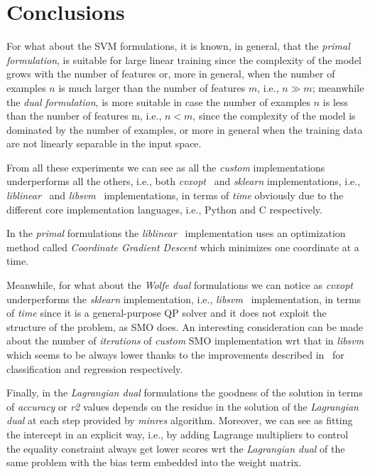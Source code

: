 \section{Conclusions}

For what about the SVM formulations, it is known, in general, that the \emph{primal formulation}, is suitable for large linear training since the complexity of the model grows with the number of features or, more in general, when the number of examples $n$ is much larger than the number of features $m$, i.e., $n \gg m$; meanwhile the \emph{dual formulation}, is more suitable in case the number of examples $n$ is less than the number of features m, i.e., $n < m$, since the complexity of the model is dominated by the number of examples, or more in general when the training data are not linearly separable in the input space.

\bigskip

From all these experiments we can see as all the \emph{custom} implementations underperforms all the others, i.e., both \emph{cvxopt}~\cite{vandenberghe2010cvxopt} and \emph{sklearn} implementations, i.e., \emph{liblinear}~\cite{fan2008liblinear} and \emph{libsvm}~\cite{chang2011libsvm} implementations, in terms of \emph{time} obviously due to the different core implementation languages, i.e., Python and C respectively.

In the \emph{primal} formulations the \emph{liblinear}~\cite{fan2008liblinear} implementation uses an optimization method called \emph{Coordinate Gradient Descent} which minimizes one coordinate at a time.

Meanwhile, for what about the \emph{Wolfe dual} formulations we can notice as \emph{cvxopt}~\cite{vandenberghe2010cvxopt} underperforms the \emph{sklearn} implementation, i.e., \emph{libsvm}~\cite{chang2011libsvm} implementation, in terms of \emph{time} since it is a general-purpose QP solver and it does not exploit the structure of the problem, as SMO does. An interesting consideration can be made about the number of \emph{iterations} of \emph{custom} SMO implementation wrt that in \emph{libsvm} which seems to be always lower thanks to the improvements described in~\cite{keerthi2001improvements, shevade1999improvements} for classification and regression respectively.

Finally, in the \emph{Lagrangian dual} formulations the goodness of the solution in terms of \emph{accuracy} or \emph{r2} values depends on the residue in the solution of the \emph{Lagrangian dual} at each step provided by \emph{minres} algorithm. Moreover, we can see as fitting the intercept in an explicit way, i.e., by adding Lagrange multipliers to control the equality constraint always get lower scores wrt the \emph{Lagrangian dual} of the same problem with the bias term embedded into the weight matrix.

